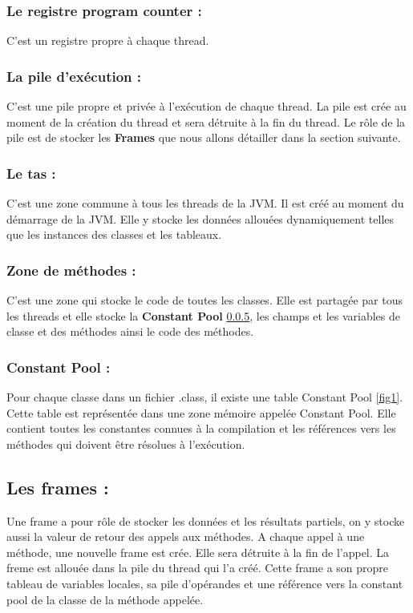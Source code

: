 \documentclass[12pt, a4paper, one side]{article}
\begin{document}
    \subsubsection{Le registre program counter :} C'est un registre propre à chaque thread.

    \subsubsection{La pile d'exécution :} C'est une pile propre et privée à l'exécution de chaque thread. La pile est crée au moment de la création du thread et sera détruite à la fin du thread. Le rôle de la pile est de stocker les \textbf{Frames} que nous allons détailler dans la section suivante.

    \subsubsection{Le tas :} C'est une zone commune à tous les threads de la JVM. Il est créé au moment du démarrage de la JVM. Elle y stocke les données allouées dynamiquement telles que les instances des classes et les tableaux.

    \subsubsection{Zone de méthodes :}
    C'est une zone qui stocke le code de toutes les classes. Elle est partagée par tous les threads et elle stocke la \textbf{Constant Pool} \ref{Constant_Pool}, les champs et les variables de classe et des méthodes ainsi le code des méthodes.

    \subsubsection{Constant Pool : } \label{Constant_Pool} Pour chaque classe dans un fichier .class, il existe une table Constant Pool \ref{fig1}. Cette table est représentée dans une zone mémoire appelée Constant Pool. Elle contient toutes les constantes connues à la compilation et les références vers les méthodes qui doivent être résolues à l'exécution.

    \subsection{Les frames :}
    Une frame a pour rôle de stocker les données et les résultats partiels, on y stocke aussi la valeur de retour des appels aux méthodes. A chaque appel à une méthode, une nouvelle frame est crée. Elle sera détruite à la fin de l'appel. La freme est allouée dans la pile du thread qui l'a créé. Cette frame a son propre tableau de variables locales, sa pile d'opérandes et une référence vers la constant pool de la classe de la méthode appelée.
\end{document}
